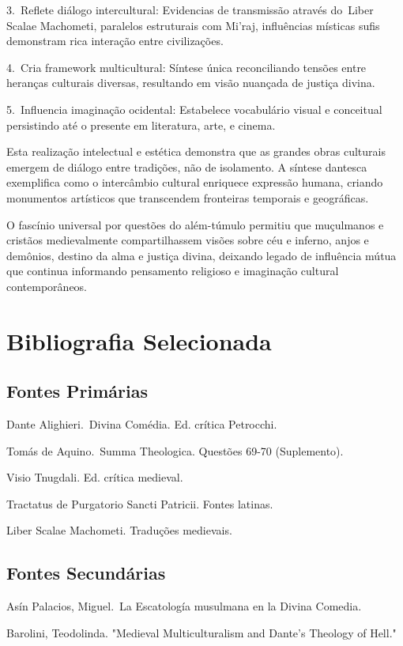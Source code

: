 3. Reflete diálogo intercultural: Evidencias de transmissão através do Liber Scalae Machometi, paralelos estruturais com Mi'raj, influências místicas sufis demonstram rica interação entre civilizações.

4. Cria framework multicultural: Síntese única reconciliando tensões entre heranças culturais diversas, resultando em visão nuançada de justiça divina.

5. Influencia imaginação ocidental: Estabelece vocabulário visual e conceitual persistindo até o presente em literatura, arte, e cinema.

Esta realização intelectual e estética demonstra que as grandes obras culturais emergem de diálogo entre tradições, não de isolamento. A síntese dantesca exemplifica como o intercâmbio cultural enriquece expressão humana, criando monumentos artísticos que transcendem fronteiras temporais e geográficas.

O fascínio universal por questões do além-túmulo permitiu que muçulmanos e cristãos medievalmente compartilhassem visões sobre céu e inferno, anjos e demônios, destino da alma e justiça divina, deixando legado de influência mútua que continua informando pensamento religioso e imaginação cultural contemporâneos.

\section{Bibliografia Selecionada}


\subsection{Fontes Primárias}

Dante Alighieri. Divina Comédia. Ed. crítica Petrocchi.

Tomás de Aquino. Summa Theologica. Questões 69-70 (Suplemento).

Visio Tnugdali. Ed. crítica medieval.

Tractatus de Purgatorio Sancti Patricii. Fontes latinas.

Liber Scalae Machometi. Traduções medievais.


\subsection{Fontes Secundárias}

Asín Palacios, Miguel. La Escatología musulmana en la Divina Comedia.

Barolini, Teodolinda. "Medieval Multiculturalism and Dante's Theology of Hell."

